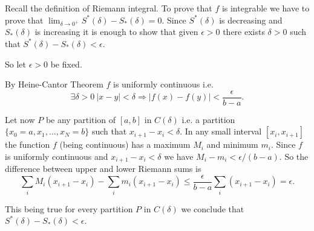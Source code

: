 \documentclass[12pt]{article}
\begin{document}
Recall the definition of Riemann integral. To prove that $f$ is integrable we have to prove that $\lim_{\delta \to 0^+} S^*(\delta)-S_*(\delta) =0$.
Since $S^*(\delta)$ is decreasing and $S_*(\delta)$ is increasing it is enough to show that given $\epsilon>0$ there exists $\delta>0$ such that $S^*(\delta)-S_*(\delta)<\epsilon$.

So let $\epsilon>0$ be fixed.

By Heine-Cantor Theorem $f$ is uniformly continuous i.e.
\[
  \exists \delta>0\ 
   \vert x-y\vert < \delta \Rightarrow \vert f(x)-f(y)\vert <\frac{\epsilon}{b-a}.
\]

Let now $P$ be any partition of $[a,b]$ in $C(\delta)$ i.e. a partition $\{x_0=a, x_1,\ldots,x_N=b\}$ such that $x_{i+1}-x_i<\delta$. In any small interval $[x_i,x_{i+1}]$ the function $f$ (being continuous) has a maximum $M_i$ and minimum $m_i$. Since $f$ is uniformly continuous and $x_{i+1}-x_i<\delta$ we  have $M_i - m_i < \epsilon/(b-a)$. So the difference between upper and lower Riemann sums is 
\[
  \sum_i M_i(x_{i+1}-x_i) - \sum_i m_i(x_{i+1}-x_i)
  \le \frac{\epsilon}{b-a} \sum_i (x_{i+1}-x_i) = \epsilon.
\] 

This being true for every partition $P$ in $C(\delta)$ we conclude that $S^*(\delta)-S_*(\delta)<\epsilon$.
\end{document}
